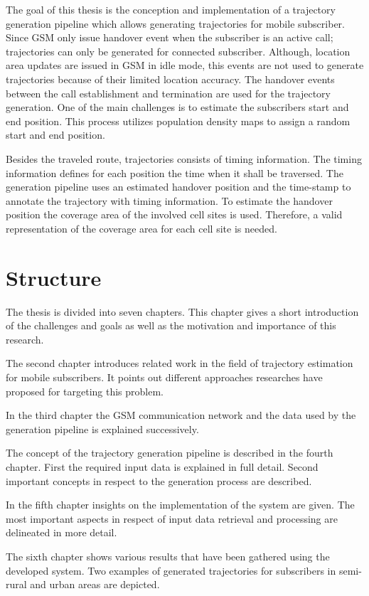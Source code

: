 The goal of this thesis is the conception and implementation of a trajectory generation pipeline which allows generating trajectories for mobile subscriber. Since GSM only issue handover event when the subscriber is an active call; trajectories can only be generated for connected subscriber. Although, location area updates are issued in GSM in idle mode, this events are not used to generate trajectories because of their limited location accuracy. The handover events between the call establishment and termination are used for the trajectory generation. One of the main challenges is to estimate the subscribers start and end position. This process utilizes population density maps to assign a random start and end position.

Besides the traveled route, trajectories consists of timing information. The timing information defines for each position the time when it shall be traversed. The generation pipeline uses an estimated handover position and the time-stamp to annotate the trajectory with timing information. To estimate the handover position the coverage area of the involved cell sites is used. Therefore, a valid representation of the coverage area for each cell site is needed.
\section{Structure}
The thesis is divided into seven chapters. This chapter gives a short introduction of the challenges and goals as well as the motivation and importance of this research. 

The second chapter introduces related work in the field of trajectory estimation for mobile subscribers. It points out different approaches researches have proposed for targeting this problem.

In the third chapter the GSM communication network and the data used by the generation pipeline is explained successively.

The concept of the trajectory generation pipeline is described in the fourth chapter. First the required input data is explained in full detail. Second important concepts in respect to the generation process are described.

In the fifth chapter insights on the implementation of the system are given. The most important aspects in respect of input data retrieval and processing are delineated in more detail.

The sixth chapter shows various results that have been gathered using the developed system. Two examples of generated trajectories for subscribers in semi-rural and urban areas are depicted.

